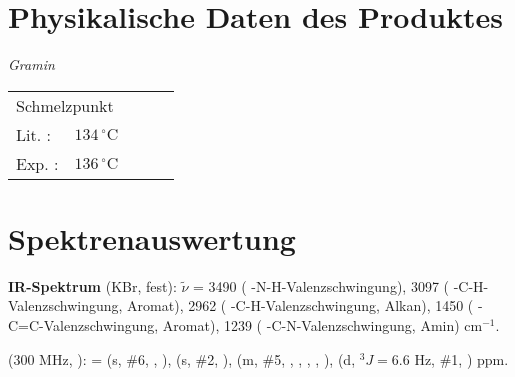 \documentclass[12pt]{article}
\begin{document}
\begin{onehalfspace}
\section{Physikalische Daten des Produktes} 
\textit{Gramin} \\[0.2cm]
\begin{tabular}{ lrclc }
 \multicolumn{2}{l}{Schmelzpunkt} & &   \\
   Lit. \cite{organikum} : & $ 134 \,^{\circ}\mathrm{C} $ & &  \\
   Exp. :& $ 136 \,^{\circ}\mathrm{C} $ & &  \\
 \end{tabular}

\section{Spektrenauswertung} 
\textbf{IR-Spektrum} (KBr, fest): $\tilde{\nu}$ = 3490 ( -N-H-Valenzschwingung), 3097 ( -C-H-Valenzschwingung, Aromat), 2962 ( -C-H-Valenzschwingung, Alkan), 1450 ( -C=C-Valenzschwingung, \mbox{Aromat}), 1239 ( -C-N-Valenzschwingung, Amin) cm$^{-1}$.\\

\begin{experimental}[format=\bfseries,delta=(ppm),list=true,use-equal,pos-number = side]
\begin{minipage}[b]{0.70\textwidth} 
\NMR* (300 \si{\MHz}, ): \chemdelta = 
 (s, \#{6}, , ),
 (s, \#{2}, ),
 (m, \#{5}, , , , , ),\hspace{5mm}
 (d, $^{3\!}J = 6.6$ \si{\Hz}, \#{1}, ) ppm.
\end{minipage}
 \hfill
\begin{minipage}[t][][b]{0.30\textwidth} 

\end{minipage}
\end{experimental}


\end{onehalfspace}
\end{document}
